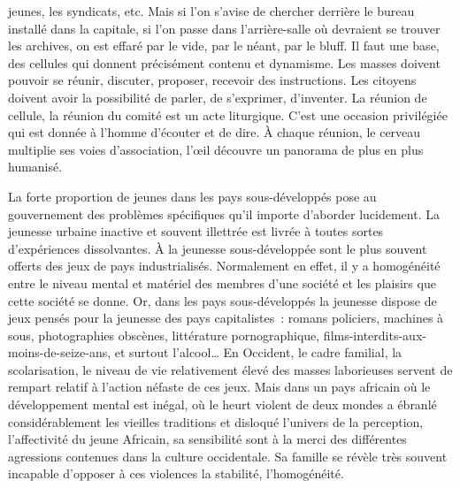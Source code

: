 \documentclass[french,twoside]{book} %
\begin{document}
jeunes, les syndicats, etc. Mais si l’on s’avise de chercher derrière le bureau installé dans la capitale, si l’on passe dans l’arrière-salle où devraient se trouver les archives, on est effaré par le vide, par le néant, par le bluff. Il faut une base, des cellules qui donnent précisément contenu et dynamisme. Les masses doivent pouvoir se réunir, discuter, proposer, recevoir des instructions. Les citoyens doivent avoir la possibilité de parler, de s’exprimer, d’inventer. La réunion de cellule, la réunion du comité est un acte liturgique. C’est une occasion privilégiée qui est donnée à l’homme d’écouter et de dire. À chaque réunion, le cerveau multiplie ses voies d’association, l’œil découvre un panorama de plus en plus humanisé.\par
\bigbreak
\noindent La forte proportion de jeunes dans les pays sous-développés pose au gouvernement des problèmes spécifiques qu’il importe d’aborder lucidement. La jeunesse urbaine inactive et souvent illettrée est livrée à toutes sortes d’expériences dissolvantes. À la jeunesse sous-développée sont le plus souvent offerts des jeux de pays industrialisés. Normalement en effet, il y a homogénéité entre le niveau mental et matériel des membres d’une société et les plaisirs que cette société se donne. Or, dans les pays sous-développés la jeunesse dispose de jeux pensés pour la jeunesse des pays capitalistes : romans policiers, machines à sous, photographies obscènes, littérature pornographique,   films-interdits-aux-moins-de-seize-ans, et surtout l’alcool… En Occident, le cadre familial, la scolarisation, le niveau de vie relativement élevé des masses laborieuses servent de rempart relatif à l’action néfaste de ces jeux. Mais dans un pays africain où le développement mental est inégal, où le heurt violent de deux mondes a ébranlé considérablement les vieilles traditions et disloqué l’univers de la perception, l’affectivité du jeune Africain, sa sensibilité sont à la merci des différentes agressions contenues dans la culture occidentale. Sa famille se révèle très souvent incapable d’opposer à ces violences la stabilité, l’homogénéité.\par
\bigbreak
\end{document}
